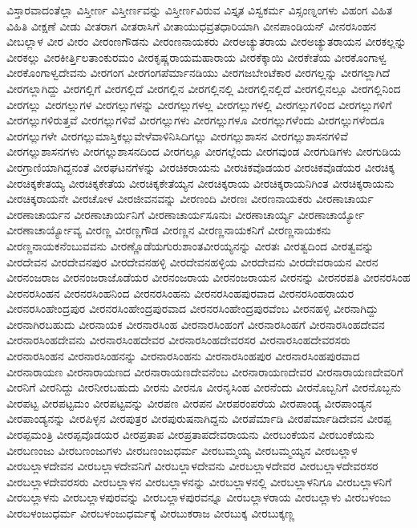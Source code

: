 {ವಿಸ್ತಾರವಾದಂತೆಲ್ಲಾ
ವಿಸ್ತೀರ್ಣ
ವಿಸ್ತೀರ್ಣವನ್ನು
ವಿಸ್ತೀರ್ಣವಿರುವ
ವಿಸ್ತೃತ
ವಿಸ್ವಕರ್ಮ
ವಿಸ್ಸಂಣ್ನಂಗಳು
ವಿಹಂಗ
ವಿಹಿತ
ವಿಹಿತಿ
ವೀಕ್ಷಣೆ
ವೀಡು
ವೀತರಾಗ
ವೀತರಾಸಿಗೆ
ವೀತಾಯುಧವ್ರತಧಾರಿಯಾಗಿ
ವೀನಪಾಂಡಿಯನ್
ವೀನರಸಿಂಹನ
ವೀಬಲ್ಲಾಳ
ವೀರ
ವೀರಂ
ವೀರಂಣಗೌಡನು
ವೀರಂಣನಾಯಕರು
ವೀರಅಚ್ಯುತರಾಯ
ವೀರಅಚ್ಯುತರಾಯನ
ವೀರಕಲ್ಲನ್ನು
ವೀರಕಲ್ಲು
ವೀರಕೀರ್ತ್ತಿಲತಾಂಕುರಮಂ
ವೀರಕೃಷ್ಣರಾಯಮಹಾರಾಯ
ವೀರಕೆಕ್ಕಾಯಿ
ವೀರಕೇತೆಯ
ವೀರಕೊಂಗಾಳ್ವ
ವೀರಕೊಂಗಾಳ್ವದೇವನು
ವೀರಗಂಗ
ವೀರಗಂಗಪೆರ್ಮಾನಡಿಯು
ವೀರಗಜಬೇಂಟೆಕಾರ
ವೀರಗಲ್ಲನ್ನು
ವೀರಗಲ್ಲಾಗಿದೆ
ವೀರಗಲ್ಲಾಗಿದ್ದು
ವೀರಗಲ್ಲಿಗೆ
ವೀರಗಲ್ಲಿದೆ
ವೀರಗಲ್ಲಿನ
ವೀರಗಲ್ಲಿನಲ್ಲಿ
ವೀರಗಲ್ಲಿನಲ್ಲಿದೆ
ವೀರಗಲ್ಲಿನಲ್ಲೂ
ವೀರಗಲ್ಲಿನಿಂದ
ವೀರಗಲ್ಲು
ವೀರಗಲ್ಲುಗಳ
ವೀರಗಲ್ಲುಗಳನ್ನು
ವೀರಗಲ್ಲುಗಳಲ್ಲ
ವೀರಗಲ್ಲುಗಳಲ್ಲಿ
ವೀರಗಲ್ಲುಗಳಿಂದ
ವೀರಗಲ್ಲುಗಳಿಗೆ
ವೀರಗಲ್ಲುಗಳಿರುತ್ತವೆ
ವೀರಗಲ್ಲುಗಳಿವೆ
ವೀರಗಲ್ಲುಗಳು
ವೀರಗಲ್ಲುಗಳೂ
ವೀರಗಲ್ಲುಗಳೆಂದು
ವೀರಗಲ್ಲುಗಳೆಂದೂ
ವೀರಗಲ್ಲುಗಳೇ
ವೀರಗಲ್ಲುಮಾಸ್ತಿಕಲ್ಲುವೇಳೆವಾಳಿನಿಸಿದಿಗಲ್ಲು
ವೀರಗಲ್ಲುಶಾಸನ
ವೀರಗಲ್ಲುಶಾಸನಗಳಿವೆ
ವೀರಗಲ್ಲುಶಾಸನಗಳು
ವೀರಗಲ್ಲುಶಾಸನದಿಂದ
ವೀರಗಲ್ಲೂ
ವೀರಗಲ್ಲೆಂದು
ವೀರಗವುಂಡ
ವೀರಗುಡಿಗಳು
ವೀರಗುಡಿಯ
ವೀರಗ್ರಾಣಿಯಾಗಿದ್ದನಂತೆ
ವೀರಘಟನಗೆಳನ್ನು
ವೀರಚಿಕರಾಯನು
ವೀರಚಿಕವೊಡಯರ
ವೀರಚಿಕವೊಡೆಯರ
ವೀರಚಿಕ್ಕ
ವೀರಚಿಕ್ಕಕೇತಯ್ಯ
ವೀರಚಿಕ್ಕಕೇತೆಯ
ವೀರಚಿಕ್ಕಕೇತೆಯ್ಯನ
ವೀರಚಿಕ್ಕರಾಯ
ವೀರಚಿಕ್ಕರಾಯನಿಗಿಂತ
ವೀರಚಿಕ್ಕರಾಯನು
ವೀರಚಿಕ್ಕರಾಯನೇ
ವೀರಚೋಳ
ವೀರಜೀವನವನ್ನು
ವೀರಣಂದಿ
ವೀರಣಃ
ವೀರಣನಾಯಕರು
ವೀರಣಾಚಾರ್ಯ
ವೀರಣಾಚಾರ್ಯನ
ವೀರಣಾಚಾರ್ಯನಿಗೆ
ವೀರಣಾಚಾರ್ಯಸೂನುಃ
ವೀರಣಾಚಾರ್ಯ್ಯ
ವೀರಣಾಚಾರ್ಯ್ಯೋ
ವೀರಣಾಚಾರ್ಯ್ಯೋವ್ಯ
ವೀರಣ್ಣ
ವೀರಣ್ಣಗೌಡ
ವೀರಣ್ಣನ
ವೀರಣ್ಣನಾಯಕನಿಗೆ
ವೀರಣ್ಣನಾಯಕನು
ವೀರಣ್ಣನಾಯಕನೆಂಬುವವನು
ವೀರಣ್ಣೊಡೆಯಗುರುಶಾಂತವೀರಯ್ಯನನ್ನು
ವೀರತಃ
ವೀರತ್ವದಿಂದ
ವೀರತ್ವವನ್ನು
ವೀರದೇವನ
ವೀರದೇವನಪುರ
ವೀರದೇವನಹಳ್ಳಿ
ವೀರದೇವನಹಳ್ಳಿಯ
ವೀರದೇವನು
ವೀರದೇವರಾಯನ
ವೀರನ
ವೀರನಂಜರಾಜ
ವೀರನಂಜರಾಜೊಡೆಯರ
ವೀರನಂಜರಾಯ
ವೀರನಂಜರಾಯನ
ವೀರನನ್ನು
ವೀರನರಪತಿ
ವೀರನರಸಿಂಹ
ವೀರನರಸಿಂಹನ
ವೀರನರಸಿಂಹನಿಂದ
ವೀರನರಸಿಂಹನು
ವೀರನರಸಿಂಹಪುರವಾದ
ವೀರನರಸಿಂಹರಾಯರ
ವೀರನರಸಿಂಹೇಂದ್ರಪುರ
ವೀರನರಸಿಂಹೇಂದ್ರಪುರವಾದ
ವೀರನರಸಿಂಹೇಂದ್ರಪುರವೆಂಬ
ವೀರನಹಳ್ಳಿ
ವೀರನಾಗಿದ್ದು
ವೀರನಾಗಿರಬಹುದು
ವೀರನಾಯಕ
ವೀರನಾರಸಿಂಹ
ವೀರನಾರಸಿಂಹಂಗೆ
ವೀರನಾರಸಿಂಹಗೆ
ವೀರನಾರಸಿಂಹದೇವನ
ವೀರನಾರಸಿಂಹದೇವನು
ವೀರನಾರಸಿಂಹದೇವರ
ವೀರನಾರಸಿಂಹದೇವರಸರ
ವೀರನಾರಸಿಂಹದೇವರಸರು
ವೀರನಾರಸಿಂಹನ
ವೀರನಾರಸಿಂಹನನ್ನು
ವೀರನಾರಸಿಂಹನು
ವೀರನಾರಸಿಂಹಪುರ
ವೀರನಾರಸಿಂಹಪುರವಾದ
ವೀರನಾರಾಯಣ
ವೀರನಾರಾಯಣದ
ವೀರನಾರಾಯಣದೇವನೆಂಬ
ವೀರನಾರಾಯಣದೇವರ
ವೀರನಾರಾಯಣದೇವರಿಗೆ
ವೀರನಿಗೆ
ವೀರನಿದ್ದು
ವೀರನೀರಬಹುದು
ವೀರನು
ವೀರನೂ
ವೀರನೃಸಿಂಹ
ವೀರನೆಂದು
ವೀರನೊಬ್ಬನಿಗೆ
ವೀರನೊಬ್ಬನು
ವೀರಪಟ್ಟ
ವೀರಪಟ್ಟಮಂ
ವೀರಪಟ್ಟವನ್ನು
ವೀರಪಣ
ವೀರಪನ
ವೀರಪರಂಪರೆಯ
ವೀರಪಾಂಡ್ಯ
ವೀರಪಾಂಡ್ಯನ
ವೀರಪಾಂಡ್ಯನನ್ನು
ವೀರಪಿಳ್ಳನ
ವೀರಪುತ್ರರ
ವೀರಪುರುಷನಾಗಿದ್ದನು
ವೀರಪೆರ್ಮಾಡಿ
ವೀರಪೆರ್ಮಾಡಿದೇವನ
ವೀರಪ್ಪ
ವೀರಪ್ಪಮಂತ್ರಿ
ವೀರಪ್ಪವೊಡಯರ
ವೀರಪ್ರತಾಪ
ವೀರಪ್ರತಾಪದೇವರಾಯನು
ವೀರಬಂಕೆಯನ
ವೀರಬಂಕೆಯನು
ವೀರಬಣಂಜು
ವೀರಬಣಂಜುಗಳು
ವೀರಬಣಂಜುಧರ್ಮ
ವೀರಬಮ್ಮಯ್ಯ
ವೀರಬಮ್ಮಯ್ಯನ
ವೀರಬಲ್ಲಾಳ
ವೀರಬಲ್ಲಾಳದೇವನ
ವೀರಬಲ್ಲಾಳದೇವನಿಗೆ
ವೀರಬಲ್ಲಾಳದೇವನು
ವೀರಬಲ್ಲಾಳದೇವರ
ವೀರಬಲ್ಲಾಳದೇವರಸರ
ವೀರಬಲ್ಲಾಳದೇವರಸರು
ವೀರಬಲ್ಲಾಳನ
ವೀರಬಲ್ಲಾಳನನ್ನು
ವೀರಬಲ್ಲಾಳನಲ್ಲಿ
ವೀರಬಲ್ಲಾಳನಿಗೂ
ವೀರಬಲ್ಲಾಳನಿಗೆ
ವೀರಬಲ್ಲಾಳನು
ವೀರಬಲ್ಲಾಳಪುರವನ್ನು
ವೀರಬಲ್ಲಾಳಪುರವನ್ನೂ
ವೀರಬಲ್ಲಾಳರಾಯ
ವೀರಬಲ್ಲಾಳು
ವೀರಬಳಂಜು
ವೀರಬಳಂಜುಧರ್ಮ
ವೀರಬಳಂಜುಧರ್ಮಕ್ಕೆ
ವೀರಬುಕರಾಜ
ವೀರಬುಕ್ಕ
ವೀರಬುಕ್ಕಣ್ಣ
}
